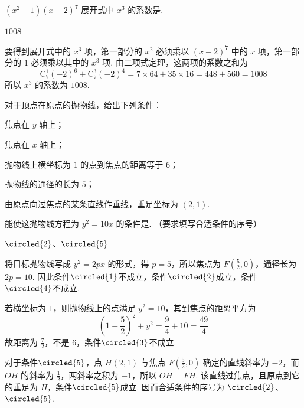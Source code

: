 \begin{problem}
\((x^{2} + 1)(x - 2)^{7}\) 展开式中 \(x^{3}\) 的系数是\fillinblank{}.
\end{problem}

\begin{answer}
\(1008\)
\end{answer}

\begin{solution}
要得到展开式中的 \(x^{3}\) 项，第一部分的 \(x^{2}\) 必须乘以 \((x-2)^{7}\) 中的 \(x\) 项，第一部分的 \(1\) 必须乘以其中的 \(x^{3}\) 项. 由二项式定理，这两项的系数之和为
\[
\mathrm C_{7}^{1}(-2)^{6}+\mathrm C_{7}^{3}(-2)^{4}=7\times64+35\times16=448+560=1008
\]
所以 \(x^{3}\) 的系数为 \(1008\).
\end{solution}

\begin{problem}
对于顶点在原点的抛物线，给出下列条件：

\begin{circlelist}
\item 焦点在 \(y\) 轴上；
\item 焦点在 \(x\) 轴上；
\item 抛物线上横坐标为 \(1\) 的点到焦点的距离等于 \(6\)；
\item 抛物线的通径的长为 \(5\)；
\item 由原点向过焦点的某条直线作垂线，垂足坐标为 \((2,1)\).
\end{circlelist}

能使这抛物线方程为 \(y^{2}=10x\) 的条件是\fillinblank{}. （要求填写合适条件的序号）
\end{problem}

\begin{answer}
\(\circled{2}\)、\(\circled{5}\)
\end{answer}

\begin{solution}
将目标抛物线写成 \(y^{2}=2px\) 的形式，得 \(p=5\)，所以焦点为 \(F\left(\frac52,0\right)\)，通径长为 \(2p=10\). 因此条件\(\circled{1}\)不成立，条件\(\circled{2}\)成立，条件\(\circled{4}\)不成立.

若横坐标为 \(1\)，则抛物线上的点满足 \(y^{2}=10\)，其到焦点的距离平方为
\[
\left(1-\frac52\right)^{2}+y^{2}=\frac94+10=\frac{49}{4}
\]
故距离为 \(\frac72\)，不是 \(6\)，条件\(\circled{3}\)不成立.

对于条件\(\circled{5}\)，点 \(H(2,1)\) 与焦点 \(F\left(\frac52,0\right)\) 确定的直线斜率为 \(-2\)，而 \(OH\) 的斜率为 \(\frac12\)，两斜率之积为 \(-1\)，所以 \(OH\perp FH\). 该直线过焦点，且原点到它的垂足为 \(H\)，条件\(\circled{5}\)成立. 因而合适条件的序号为 \(\circled{2}\)、\(\circled{5}\).
\end{solution}

